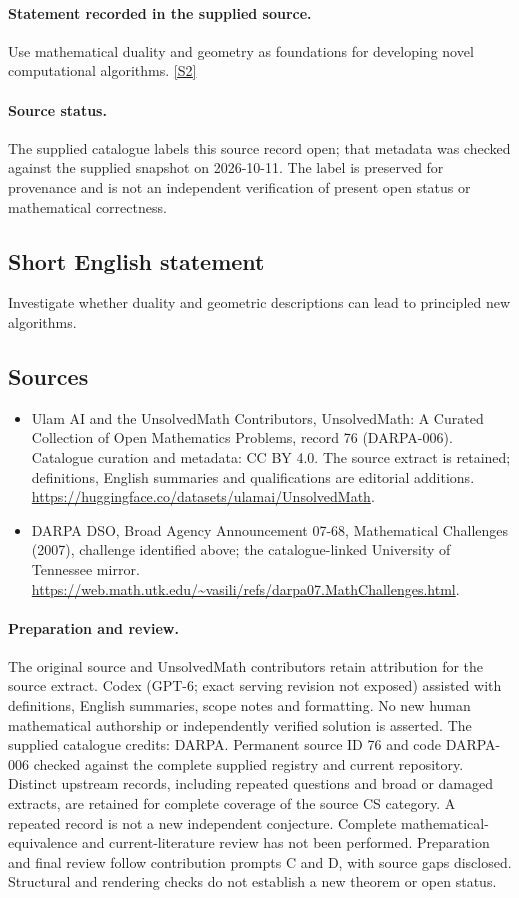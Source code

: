 \documentclass[11pt]{article}
\begin{document}
\paragraph{Statement recorded in the supplied source.}
Use mathematical duality and geometry as foundations for developing novel computational algorithms. \href{https://web.math.utk.edu/~vasili/refs/darpa07.MathChallenges.html}{[S2]}
\paragraph{Source status.}
The supplied catalogue labels this source record open; that metadata was checked against the supplied snapshot on 2026-10-11. The label is preserved for provenance and is not an independent verification of present open status or mathematical correctness.
\subsection{Short English statement}
Investigate whether duality and geometric descriptions can lead to principled new algorithms.
\subsection{Sources}
\begin{itemize}
\item[S1] Ulam AI and the UnsolvedMath Contributors, UnsolvedMath: A Curated Collection of Open Mathematics Problems, record 76 (DARPA-006). Catalogue curation and metadata: CC BY 4.0. The source extract is retained; definitions, English summaries and qualifications are editorial additions.
\url{https://huggingface.co/datasets/ulamai/UnsolvedMath}.
\item[S2] DARPA DSO, Broad Agency Announcement 07-68, Mathematical Challenges (2007), challenge identified above; the catalogue-linked University of Tennessee mirror.
\url{https://web.math.utk.edu/~vasili/refs/darpa07.MathChallenges.html}.
\end{itemize}
\paragraph{Preparation and review.}
The original source and UnsolvedMath contributors retain attribution for the source extract. Codex (GPT-6; exact serving revision not exposed) assisted with definitions, English summaries, scope notes and formatting. No new human mathematical authorship or independently verified solution is asserted. The supplied catalogue credits: DARPA. Permanent source ID 76 and code DARPA-006 checked against the complete supplied registry and current repository. Distinct upstream records, including repeated questions and broad or damaged extracts, are retained for complete coverage of the source CS category. A repeated record is not a new independent conjecture. Complete mathematical-equivalence and current-literature review has not been performed. Preparation and final review follow contribution prompts C and D, with source gaps disclosed. Structural and rendering checks do not establish a new theorem or open status.
\label{end:76}
\end{document}
